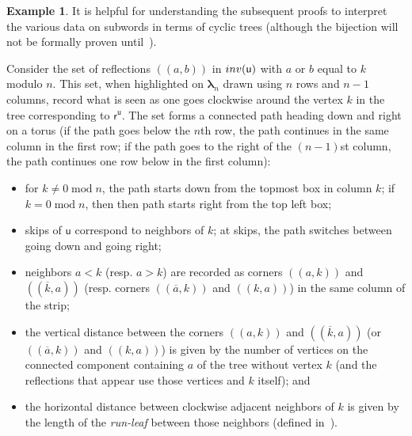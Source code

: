 \documentclass[a4paper,10pt,leqno]{amsart}
\numberwithin{equation}{section}
\theoremstyle{definition}
\newtheorem{example}[theorem]{Example}
\theoremstyle{remark}
\renewcommand{\u}{\mathsf{u}}
\newcommand{\Inv}{\textsc{inv}}
\renewcommand{\mod}{\;\mathrm{mod}\;}
\newcommand{\rr}{\mathsf{r}}
\newcommand{\rru}{\rr^\u}
\newcommand{\blambda}{\bm{\lambda}}
\begin{document}


\begin{example}
It is helpful for understanding the subsequent proofs to interpret the various data on subwords in terms of cyclic trees (although the bijection will not be formally proven until~).

Consider the set of reflections $(\!(a,b)\!)$ in $\Inv(\u)$ with $a$ or $b$ equal to $k$ modulo $n$.  This set, when highlighted on $\blambda_n$ drawn using $n$ rows and $n-1$ columns, record what is seen as one goes clockwise around the vertex $k$ in the tree corresponding to $\rru$.  The set forms a connected path heading down and right on a torus (if the path goes below the $n$th row, the path continues in the same column in the first row; if the path goes to the right of the $(n-1)$st column, the path continues one row below in the first column):
\begin{itemize}
\item for $k\neq 0 \mod n$, the path starts down from the topmost box in column $k$; if $k=0 \mod n$, then then path starts right from the top left box;
\item skips of $\u$ correspond to neighbors of $k$; at skips, the path switches between going down and going right;
\item neighbors $a<k$ (resp. $a>k$) are recorded as corners $(\!(a,k)\!)$ and $(\!(\overline{k},a)\!)$ (resp. corners $(\!(\overline{a},k)\!)$ and $(\!(k,a)\!)$) in the same column of the strip;
\item the vertical distance between the corners $(\!(a,k)\!)$ and $(\!(\overline{k},a)\!)$ (or $(\!(\overline{a},k)\!)$ and $(\!(k,a)\!)$) is given by the number of vertices on the connected component containing $a$ of the tree without vertex $k$ (and the reflections that appear use those vertices and $k$ itself); and
\item the horizontal distance between clockwise adjacent neighbors of $k$ is given by the length of the \emph{run-leaf} between those neighbors (defined in~).%
\end{itemize}


\end{example}
\end{document}
